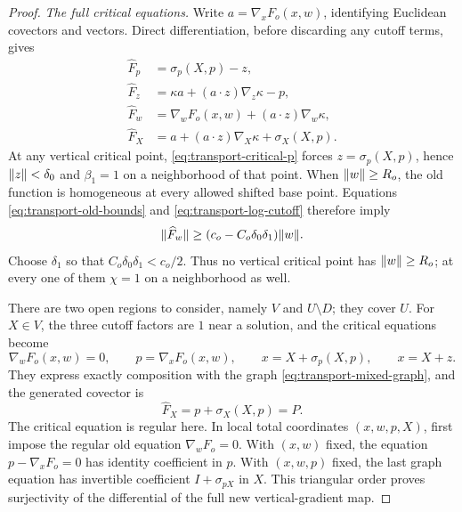 \begin{proof}
\emph{The full critical equations.}
Write $a=\nabla_xF_o(x,w)$, identifying Euclidean covectors and
vectors.  Direct differentiation, before discarding any cutoff
terms, gives
\begin{align}
 \widehat F_p&=\sigma_p(X,p)-z,\label{eq:transport-critical-p}\\
 \widehat F_z&=\kappa a+(a\cdot z)\nabla_z\kappa-p,
       \label{eq:transport-critical-z}\\
 \widehat F_w&=\nabla_wF_o(x,w)+(a\cdot z)\nabla_w\kappa,
       \label{eq:transport-critical-w}\\
 \widehat F_X&=a+(a\cdot z)\nabla_X\kappa+\sigma_X(X,p).
       \label{eq:transport-output}
\end{align}
At any vertical critical point, \eqref{eq:transport-critical-p}
forces $z=\sigma_p(X,p)$, hence $\lVert z\rVert<\delta_0$ and $\beta_1=1$
on a neighborhood of that point.  When $\lVert w\rVert\ge R_o$, the old
function is homogeneous at every allowed shifted base point.
Equations \eqref{eq:transport-old-bounds} and
\eqref{eq:transport-log-cutoff} therefore imply
\begin{equation}
 \lVert\widehat F_w\rVert
 \ge(c_o-C_o\delta_0\delta_1)\lVert w\rVert.
 \label{eq:transport-outer-gradient}
\end{equation}
Choose $\delta_1$ so that $C_o\delta_0\delta_1<c_o/2$.
Thus no vertical critical point has $\lVert w\rVert\ge R_o$; at every one of
them $\chi=1$ on a neighborhood as well.

There are two open regions to consider, namely $V$ and $U\setminus D$;
they cover $U$.
For $X\in V$, the three cutoff factors are $1$ near a solution, and
the critical equations become
\begin{equation}
 \nabla_wF_o(x,w)=0,
 \qquad p=\nabla_xF_o(x,w),
 \qquad x=X+\sigma_p(X,p),
 \qquad x=X+z.
 \label{eq:transport-supported-critical}
\end{equation}
They express exactly composition with the graph
\eqref{eq:transport-mixed-graph}, and the generated covector is
\begin{equation}
 \widehat F_X=p+\sigma_X(X,p)=P.
 \label{eq:transport-supported-output}
\end{equation}
The critical equation is regular here.  In local total coordinates
$(x,w,p,X)$, first impose the regular old equation
$\nabla_wF_o=0$.  With $(x,w)$ fixed, the equation
$p-\nabla_xF_o=0$ has identity coefficient in $p$.  With $(x,w,p)$
fixed, the last graph equation has invertible coefficient
$I+\sigma_{pX}$ in $X$.  This triangular order proves surjectivity
of the differential of the full new vertical-gradient map.


\end{proof}
